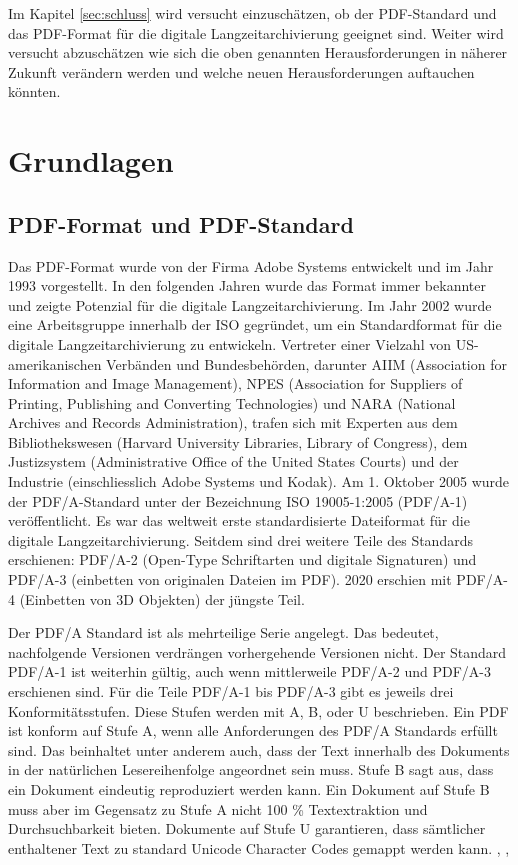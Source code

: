 \documentclass[a4paper,oneside, 12pt]{report}
\begin{document}
Im Kapitel \ref{sec:schluss} wird versucht einzuschätzen, ob der PDF-Standard und das PDF-Format für die digitale Langzeitarchivierung geeignet sind. Weiter wird versucht abzuschätzen wie sich die oben genannten Herausforderungen in näherer Zukunft verändern werden und welche neuen Herausforderungen auftauchen könnten.




\chapter{Grundlagen}\label{sec:grundlagen}
\section{PDF-Format und PDF-Standard}
Das PDF-Format wurde von der Firma Adobe Systems entwickelt und im Jahr 1993 vorgestellt. In den folgenden Jahren wurde das Format immer bekannter und zeigte Potenzial für die digitale Langzeitarchivierung. Im Jahr 2002 wurde eine Arbeitsgruppe innerhalb der \ac{ISO} gegründet, um ein Standardformat für die digitale Langzeitarchivierung zu entwickeln. Vertreter einer Vielzahl von US-amerikanischen Verbänden und Bundesbehörden, darunter AIIM (Association for Information and Image Management), NPES (Association for Suppliers of Printing, Publishing and Converting Technologies) und NARA (National Archives and Records Administration), trafen sich mit Experten aus dem Bibliothekswesen (Harvard University Libraries, Library of Congress), dem Justizsystem (Administrative Office of the United States Courts) und der Industrie (einschliesslich Adobe Systems und Kodak). Am 1. Oktober 2005 wurde der PDF/A-Standard unter der Bezeichnung ISO 19005-1:2005 (PDF/A-1) veröffentlicht. Es war das weltweit erste standardisierte Dateiformat für die digitale Langzeitarchivierung. Seitdem sind drei weitere Teile des Standards erschienen: PDF/A-2 (Open-Type Schriftarten und digitale Signaturen) und PDF/A-3 (einbetten von originalen Dateien im PDF). 2020 erschien mit PDF/A-4 (Einbetten von 3D Objekten) der jüngste Teil. \cite{pdfhist}

Der PDF/A Standard ist als mehrteilige Serie angelegt. Das bedeutet, nachfolgende Versionen verdrängen vorhergehende Versionen nicht. Der Standard PDF/A-1 ist weiterhin gültig, auch wenn mittlerweile PDF/A-2 und PDF/A-3 erschienen sind. Für die Teile PDF/A-1 bis PDF/A-3 gibt es jeweils drei Konformitätsstufen. Diese Stufen werden mit A, B, oder U beschrieben. Ein PDF ist konform auf Stufe A, wenn alle Anforderungen des PDF/A Standards erfüllt sind. Das beinhaltet unter anderem auch, dass der Text innerhalb des Dokuments in der natürlichen Lesereihenfolge angeordnet sein muss. Stufe B sagt aus, dass ein Dokument eindeutig reproduziert werden kann. Ein Dokument auf Stufe B muss aber im Gegensatz zu Stufe A nicht 100 \% Textextraktion und Durchsuchbarkeit bieten. Dokumente auf Stufe U garantieren, dass sämtlicher enthaltener Text zu standard Unicode Character Codes gemappt werden kann. \cite{pdfhist}, \cite{pdftools}, \cite{adobepdf}
\end{document}
